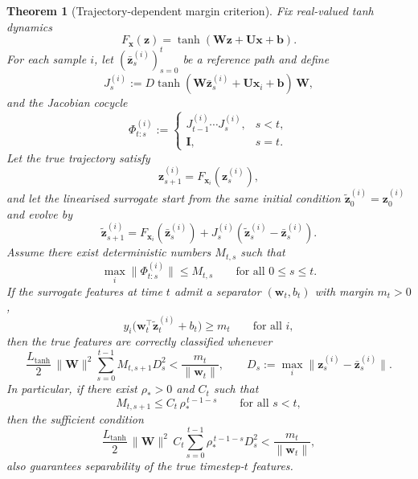 \documentclass{article}
\newtheorem{theorem}{Theorem}
\theoremstyle{remark}
\newcommand{\bz}{\mathbf{z}}
\newcommand{\bx}{\mathbf{x}}
\newcommand{\bW}{\mathbf{W}}
\newcommand{\bU}{\mathbf{U}}
\begin{document}
\begin{theorem}[Trajectory-dependent margin criterion]
\label{thm:trajectory_margin}
Fix real-valued tanh dynamics
\[
  F_{\bx}(\bz) = \tanh(\bW\bz + \bU\bx + \mathbf{b}).
\]
For each sample $i$, let $(\bar{\bz}_s^{(i)})_{s=0}^t$ be a reference path and define
\[
  J_s^{(i)}
  := D\tanh(\bW\bar{\bz}_s^{(i)} + \bU\bx_i + \mathbf{b})\,\bW,
\]
and the Jacobian cocycle
\[
  \Phi_{t:s}^{(i)}
  :=
  \begin{cases}
    J_{t-1}^{(i)} \cdots J_s^{(i)}, & s < t,\\
    \mathbf{I}, & s=t.
  \end{cases}
\]
Let the true trajectory satisfy
\[
  \bz_{s+1}^{(i)} = F_{\bx_i}(\bz_s^{(i)}),
\]
and let the linearised surrogate start from the same initial condition
$\tilde{\bz}_0^{(i)} = \bz_0^{(i)}$ and evolve by
\[
  \tilde{\bz}_{s+1}^{(i)}
  = F_{\bx_i}(\bar{\bz}_s^{(i)})
    + J_s^{(i)}(\tilde{\bz}_s^{(i)} - \bar{\bz}_s^{(i)}).
\]
Assume there exist deterministic numbers $M_{t,s}$ such that
\[
  \max_i \|\Phi_{t:s}^{(i)}\| \leq M_{t,s}
  \qquad \text{for all } 0 \leq s \leq t.
\]
If the surrogate features at time $t$ admit a separator $(\mathbf{w}_t,b_t)$
with margin $m_t > 0$,
\[
  y_i\bigl(\mathbf{w}_t^\top \tilde{\bz}_t^{(i)} + b_t\bigr) \geq m_t
  \qquad \text{for all } i,
\]
then the true features are correctly classified whenever
\begin{equation}
  \frac{L_{\tanh}}{2}\,\|\bW\|^2
  \sum_{s=0}^{t-1} M_{t,s+1} D_s^2
  < \frac{m_t}{\|\mathbf{w}_t\|},
  \qquad
  D_s := \max_i \|\bz_s^{(i)} - \bar{\bz}_s^{(i)}\|.
  \label{eq:trajectory_margin_condition}
\end{equation}
In particular, if there exist $\rho_\ast > 0$ and $C_t$ such that
\[
  M_{t,s+1} \leq C_t\,\rho_\ast^{\,t-1-s}
  \qquad \text{for all } s < t,
\]
then the sufficient condition
\begin{equation}
  \frac{L_{\tanh}}{2}\,\|\bW\|^2\,C_t
  \sum_{s=0}^{t-1} \rho_\ast^{\,t-1-s} D_s^2
  < \frac{m_t}{\|\mathbf{w}_t\|},
  \label{eq:trajectory_margin_geometric}
\end{equation}
also guarantees separability of the true timestep-$t$ features.
\end{theorem}
\end{document}
